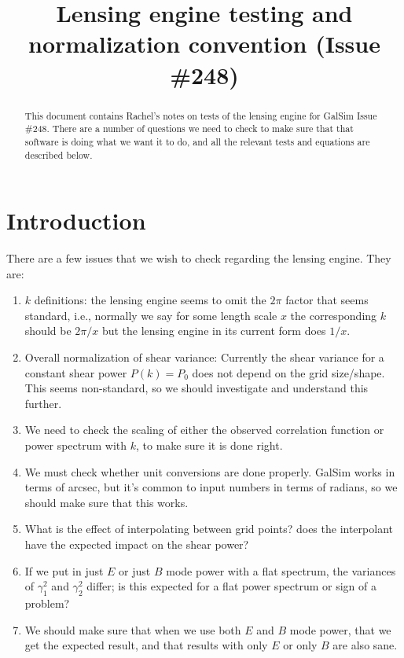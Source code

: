 \documentclass[preprint]{aastex}
\begin{document}
\title{Lensing engine testing and normalization convention (Issue \#248)}

\begin{abstract}
This document contains Rachel's notes on tests of the lensing engine
for GalSim Issue \#248.  There are a number of questions we need to
check to make sure that that software is doing what we want it to do,
and all the relevant tests and equations are described below.
\end{abstract}

\section{Introduction}

There are a few issues that we wish to check regarding the lensing
engine.  They are:

\begin{enumerate}
\item $k$ definitions: the lensing engine seems to omit the $2\pi$
  factor that seems standard, i.e., normally we say for some length
  scale $x$ the corresponding $k$ should be $2\pi/x$ but the lensing
  engine in its current form does $1/x$.
\item Overall normalization of shear variance: Currently the shear
  variance for a constant shear power $P(k)=P_0$ does not depend on
  the grid size/shape.  This seems non-standard, so we should
  investigate and understand this further.
\item We need to check the scaling of either the observed correlation
  function or power spectrum with $k$, to make sure it is done right.
\item We must check whether unit conversions are done properly.
  GalSim works in terms of arcsec, but it's common to input numbers in
  terms of radians, so we should make sure that this works.
\item What is the effect of interpolating between grid points?  does
  the interpolant have the expected impact on the shear power?
\item If we put in just $E$ or just $B$ mode power with a flat
  spectrum, the variances of $\gamma_1^2$ and $\gamma_2^2$ differ; is
  this expected for a flat power spectrum or sign of a problem?
\item We should make sure that when we use both $E$ and $B$ mode
  power, that we get the expected result, and that results with only
  $E$ or only $B$ are also sane.
\end{enumerate}
\end{document}
